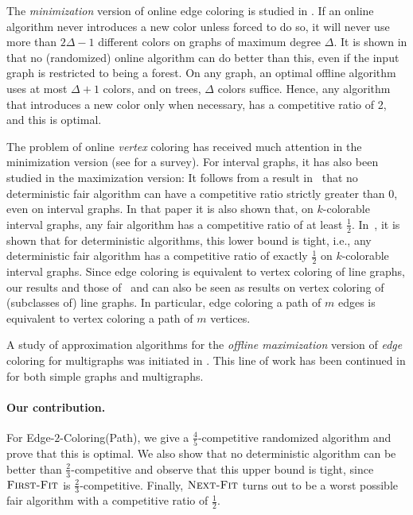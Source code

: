 \documentclass[smallextended]{svjour3}
\def\mcpath{{\sc Edge-$2$-Coloring(Path)}\xspace}
\newcommand{\NF}{\ensuremath{\operatorname{\textsc{Next-Fit}}}\xspace}
\newcommand{\FF}{\ensuremath{\operatorname{\textsc{First-Fit}}}\xspace}
\begin{document}
The {\em minimization} version of online edge coloring is studied in
\cite{Bar-Noy}. If an online algorithm never introduces a new color
unless forced to do so, it will never use more than $2\Delta -1$
different colors on graphs of maximum degree $\Delta$. It is shown in
\cite{Bar-Noy} that no (randomized) online algorithm can do better than this, even
if the input graph is restricted to being a forest.
On any graph, an optimal offline algorithm uses at most $\Delta +1$
 colors, and on trees, $\Delta$ colors suffice.
Hence, any algorithm that introduces a new color only when necessary,
 has a competitive ratio of 2, and this is optimal.

 The problem of online {\em vertex} coloring has received much attention in
the minimization version (see 
\cite{kierstead1998coloring} for a survey). 
For interval graphs, it has also been studied in the maximization version:
It follows from a result in~\cite{seatres} that
no deterministic fair algorithm can have a competitive ratio strictly
greater than $0$, even on interval graphs.
In that paper it is also shown that, on $k$-colorable interval graphs,
any fair algorithm has a competitive ratio of at least
$\frac12$. 
In~\cite{seatresTight}, it is shown that for deterministic algorithms,
this lower bound is tight, i.e., any deterministic fair algorithm has
a competitive ratio of exactly $\frac12$ on $k$-colorable interval
graphs.
Since edge coloring is equivalent to vertex coloring of line graphs,
our results and those of~\cite{kedge} and \cite{kedge2} can also
be seen as results on vertex coloring of (subclasses of) line graphs.
In particular, edge coloring a path of
$m$ edges is equivalent to vertex coloring a
path of $m$ vertices.

A study of approximation algorithms for the {\em offline maximization} version of {\em edge} coloring for multigraphs was initiated in \cite{Faprox}. This line of work has been continued in \cite{aprox1, aprox2, aprox3SIDMA, aprox6} for both simple graphs and multigraphs.

\paragraph{Our contribution.}
For \mcpath, we give a $\frac45$-competitive randomized algorithm and
prove that this is optimal. We also show that no deterministic
algorithm can be better than $\frac23$-competitive and observe that
this upper bound is tight, since \FF is $\frac23$-competitive. 
Finally, \NF turns out to be a worst possible fair algorithm with a competitive ratio of $\frac12$.
\end{document}
